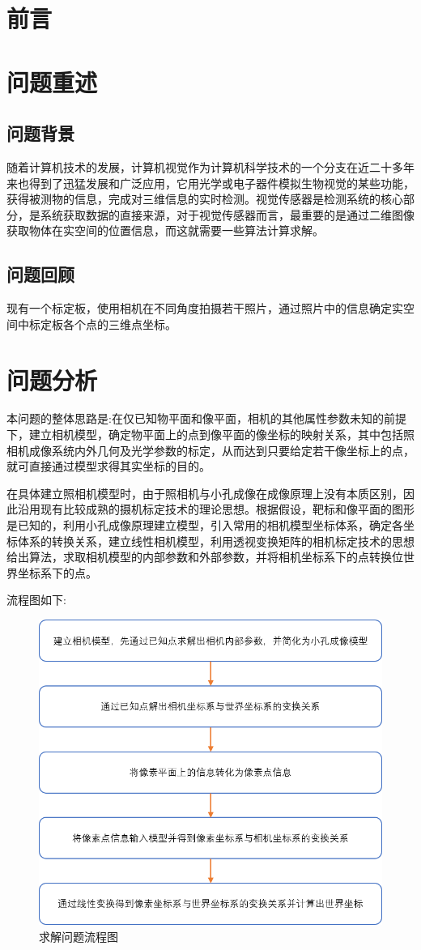 \documentclass{article}
\numberwithin{equation}{section}						%
\numberwithin{figure}{section}							%
\begin{document}
\begin{sloppypar}
	
	\newpage\tableofcontents\newpage
	\section{前言}

	\section{问题重述}
	\subsection{问题背景}
	随着计算机技术的发展，计算机视觉作为计算机科学技术的一个分支在近二十多年来也得到了迅猛发展和广泛应用，它用光学或电子器件模拟生物视觉的某些功能，获得被测物的信息，完成对三维信息的实时检测。视觉传感器是检测系统的核心部分，是系统获取数据的直接来源，对于视觉传感器而言，最重要的是通过二维图像获取物体在实空间的位置信息，而这就需要一些算法计算求解。
	\subsection{问题回顾}
	现有一个标定板，使用相机在不同角度拍摄若干照片，通过照片中的信息确定实空间中标定板各个点的三维点坐标。
	\section{问题分析}
	本问题的整体思路是:在仅已知物平面和像平面，相机的其他属性参数未知的前提下，建立相机模型，确定物平面上的点到像平面的像坐标的映射关系，其中包括照相机成像系统内外几何及光学参数的标定，从而达到只要给定若干像坐标上的点，就可直接通过模型求得其实坐标的目的。
	
	在具体建立照相机模型时，由于照相机与小孔成像在成像原理上没有本质区别，因此沿用现有比较成熟的摄机标定技术的理论思想。根据假设，靶标和像平面的图形是已知的，利用小孔成像原理建立模型，引入常用的相机模型坐标体系，确定各坐标体系的转换关系，建立线性相机模型，利用透视变换矩阵的相机标定技术的思想给出算法，求取相机模型的内部参数和外部参数，并将相机坐标系下的点转换位世界坐标系下的点。
	
	流程图如下:
	\begin{figure}[H]
		\centering
		\includegraphics[width=0.7\linewidth]{flow_chart}
		\caption{求解问题流程图}
		\label{flow_chart}
	\end{figure}
	

\end{sloppypar}
\end{document}
